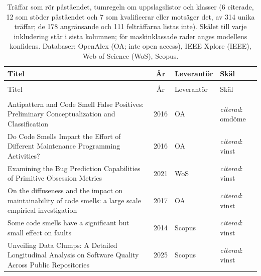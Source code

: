 
\begingroup\footnotesize
\begin{longtable}{@{}%
  >{\raggedright\arraybackslash}p{}c%
  >{\raggedright\arraybackslash}p{}%
  >{\raggedright\arraybackslash}p{}@{}}
\caption{Träffar som rör påståendet, tumregeln om uppslagslistor och klasser (6 citerade, 12 som stöder påståendet och 7 som kvalificerar eller motsäger det, av 314 unika träffar; de 178 angränsande och 111 felträffarna listas inte). Skälet till varje inkludering står i sista kolumnen; för maskinklassade rader anges modellens konfidens. Databaser: OpenAlex (OA; inte open access), IEEE Xplore (IEEE), Web of Science (WoS), Scopus.}\label{tab:sok-tumregel}\\
\toprule
Titel & År & Leverantör & Skäl \\
\midrule
\endfirsthead
\multicolumn{4}{@{}l}{\emph{\tablename~\thetable{} (forts.)}}\\
\toprule
Titel & År & Leverantör & Skäl \\
\midrule
\endhead
\midrule \multicolumn{4}{r@{}}{\emph{forts.\ på nästa sida}}\\
\endfoot
\bottomrule
\endlastfoot
Antipattern and Code Smell False Positives: Preliminary Conceptualization and Classification & 2016 & OA & \emph{citerad}: omdöme \\
Do Code Smells Impact the Effort of Different Maintenance Programming Activities? & 2016 & OA & \emph{citerad}: vinst \\
Examining the Bug Prediction Capabilities of Primitive Obsession Metrics & 2021 & WoS & \emph{citerad}: vinst \\
On the diffuseness and the impact on maintainability of code smells: a large scale empirical investigation & 2017 & OA & \emph{citerad}: vinst \\
Some code smells have a significant but small effect on faults & 2014 & Scopus & \emph{citerad}: vinst \\
Unveiling Data Clumps: A Detailed Longitudinal Analysis on Software Quality Across Public Repositories & 2025 & Scopus & \emph{citerad}: vinst \\

\end{longtable}
